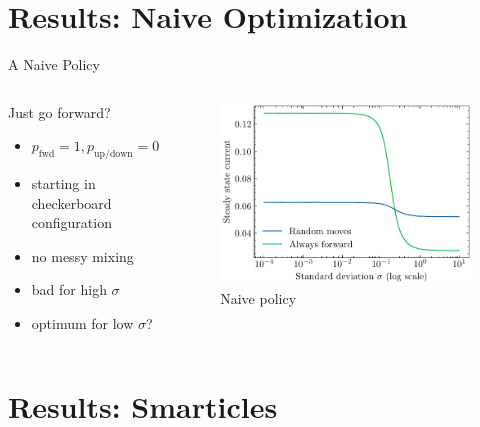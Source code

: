 \documentclass[10pt,xcolor=table, aspectratio=1610]{beamer}
\begin{document}
\section[Naive Policy]{Results: Naive Optimization}
\begin{frame}{A Naive Policy}
  \begin{columns}
    \begin{block}{Just go forward?}
      \begin{itemize}
        \item $p_\text{fwd} = 1, p_\text{up/down} = 0$
        \item starting in checkerboard configuration
        \item no messy mixing
        \item bad for high $\sigma$
        \item optimum for low $\sigma$?
      \end{itemize}
    \end{block}
    \begin{figure}
      \includegraphics[width=\textwidth]{../Thesis/img/results/steady_state_current_both_log.pdf}
      \caption*{Naive policy}
    \end{figure}
  \end{columns}
\end{frame}

\section[Smarticles]{Results: Smarticles}
\end{document}
